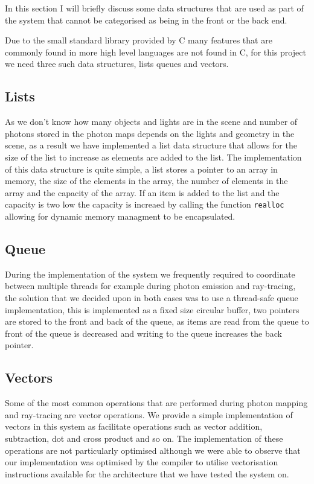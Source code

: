 In this section I will briefly discuss some data structures that are used as part of the system that cannot
be categorised as being in the front or the back end.

Due to the small standard library provided by C many features that are commonly found in more high level languages are not
found in C, for this project we need three such data structures, lists queues and vectors.

\subsection{Lists}
As we don't know how many objects and lights are in the scene and number of photons stored in the photon maps depends on the
lights and geometry in the scene, as a result we have implemented a list data structure that allows for the size of the list
to increase as elements are added to the list. The implementation of this data structure is quite simple, a list stores
a pointer to an array in memory, the size of the elements in the array, the number of elements in the array and the capacity of the
array. If an item is added to the list and the capacity is two low the capacity is increaed by calling the function \texttt{realloc}
allowing for dynamic memory managment to be encapsulated.

\subsection{Queue}
During the implementation of the system we frequently required to coordinate between multiple threads for example during
photon emission and ray-tracing, the solution that we decided upon in both cases was to use a thread-safe queue implementation, this is implemented as a
fixed size circular buffer, two pointers are stored to the front and back of the queue, as items are read from the queue to
front of the queue is decreased and writing to the queue increases the back pointer.

\subsection{Vectors}
Some of the most common operations that are performed during photon mapping and ray-tracing are vector operations. We provide a simple
implementation of vectors in this system as facilitate operations such as vector addition, subtraction, dot and cross product and so on. The
implementation of these operations are not particularly optimised although we were able to observe that our implementation was optimised
by the compiler to utilise vectorisation instructions available for the architecture that we have tested the system on.
